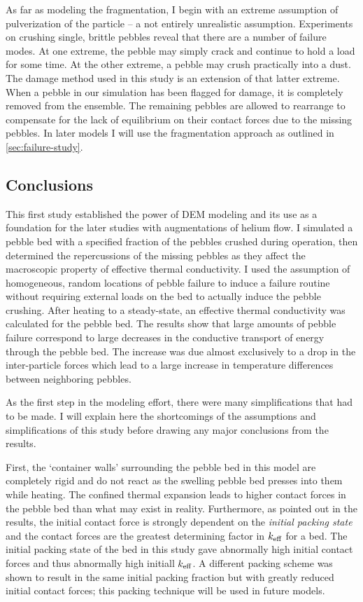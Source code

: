 As far as modeling the fragmentation, I begin with an extreme assumption of pulverization of the particle -- a not entirely unrealistic assumption. Experiments on crushing single, brittle pebbles reveal that there are a number of failure modes.\cite{Wu2004} At one extreme, the pebble may simply crack and continue to hold a load for some time. At the other extreme, a pebble may crush practically into a dust. The damage method used in this study is an extension of that latter extreme. When a pebble in our simulation has been flagged for damage, it is completely removed from the ensemble. The remaining pebbles are allowed to rearrange to compensate for the lack of equilibrium on their contact forces due to the missing pebbles. In later models I will use the fragmentation approach as outlined in \cref{sec:failure-study}.



\subsection{Conclusions}
\label{sec:dem-conclusions}
This first study established the power of DEM modeling and its use as a foundation for the later studies with augmentations of helium flow. I simulated a pebble bed with a specified fraction of the pebbles crushed during operation, then determined the repercussions of the missing pebbles as they affect the macroscopic property of effective thermal conductivity. I used the assumption of homogeneous, random locations of pebble failure to induce a failure routine without requiring external loads on the bed to actually induce the pebble crushing. After heating to a steady-state, an effective thermal conductivity was calculated for the pebble bed. The results show that large amounts of pebble failure correspond to large decreases in the conductive transport of energy through the pebble bed. The increase was due almost exclusively to a drop in the inter-particle forces which lead to a large increase in temperature differences between neighboring pebbles.

As the first step in the modeling effort, there were many simplifications that had to be made. I will explain here the shortcomings of the assumptions and simplifications of this study before drawing any major conclusions from the results.

First, the `container walls' surrounding the pebble bed in this model are completely rigid and do not react as the swelling pebble bed presses into them while heating. The confined thermal expansion leads to higher contact forces in the pebble bed than what may exist in reality. Furthermore, as pointed out in the results, the initial contact force is strongly dependent on the \textit{initial packing state} and the contact forces are the greatest determining factor in $k_\text{eff}$ for a bed. The initial packing state of the bed in this study gave abnormally high initial contact forces and thus abnormally high initiall $k_\text{eff}$. A different packing scheme was shown to result in the same initial packing fraction but with greatly reduced initial contact forces; this packing technique will be used in future models. 

